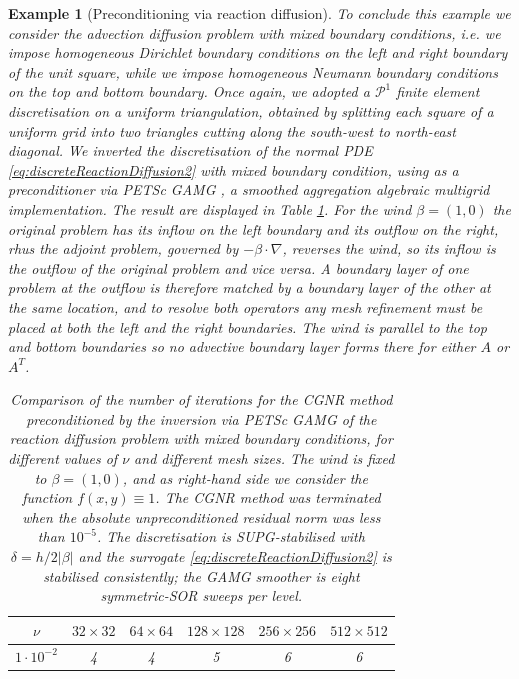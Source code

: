 \documentclass[hidelinks,onefignum,onetabnum]{siamart220329}
\newcommand{\bb}[1]{#1}
\newtheorem{example}{Example}
\begin{document}
\begin{example}[Preconditioning via reaction diffusion]
    To conclude this example we consider the advection diffusion problem with mixed boundary conditions, i.e. we impose homogeneous Dirichlet boundary conditions on the left and right boundary of the unit square, while we impose homogeneous Neumann boundary conditions on the top and bottom boundary.
    Once again, we adopted a $\mathcal{P}^1$ finite element discretisation on a uniform triangulation, obtained by splitting each square of a uniform grid into two triangles cutting along the south-west to north-east diagonal.
    We inverted the discretisation of the normal PDE \eqref{eq:discreteReactionDiffusion2} with mixed boundary condition, using as a preconditioner via PETSc GAMG \cite{Adams}, a smoothed aggregation algebraic multigrid implementation. The result are displayed in Table \ref{tab:reactionDiffusionAMG3}.
    \bb{For the wind $\beta=(1,0)$ the original problem has its inflow on the left boundary and its outflow on the right, rhus the adjoint problem, governed by $-\beta\cdot\nabla$, reverses the wind, so its inflow is the outflow of the original problem and vice versa. A boundary layer of one problem at the outflow is therefore matched by a boundary layer of the other at the same location, and to resolve both operators any mesh refinement must be placed at \emph{both} the left and the right boundaries. The wind is parallel to the top and bottom boundaries so no advective boundary layer forms there for either $A$ or $A^T$.}
    \begin{table}
        \centering
        \caption{Comparison of the number of iterations for the CGNR method preconditioned by the inversion via PETSc GAMG of the reaction diffusion problem with mixed boundary conditions, for different values of $\nu$ and different mesh sizes.
            The wind is fixed to $\beta = (1,0)$, and as right-hand side we consider the function $f(x,y) \equiv 1$.
            The CGNR method was terminated when the absolute unpreconditioned residual  \bb{norm} was less than $10^{-5}$. \bb{The discretisation is SUPG-stabilised with $\delta = h/2|\beta|$ and the surrogate \eqref{eq:discreteReactionDiffusion2} is stabilised consistently; the GAMG smoother is eight symmetric-SOR sweeps per level.}}
        \label{tab:reactionDiffusionAMG3}
        \begin{tabular}{c|c|c|c|c|c}
            \toprule
            $\nu$               & $32\times 32$ & $64\times 64$ & $128\times 128$ & $256\times 256$ & $512\times 512$ \\
            \midrule
            $1\cdot 10^{-2}$    &  4 &  4 &  5 &  6 &  6 \\

\end{tabular}
\end{table}
\end{example}
\end{document}

